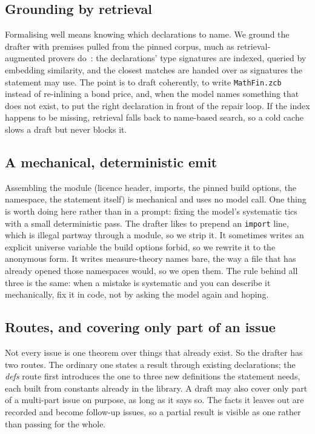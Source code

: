 \documentclass[11pt]{article}
\newcommand{\lean}[1]{\texttt{\def\_{\textunderscore\allowbreak}#1}}
\begin{document}
\subsection{Grounding by retrieval}
Formalising well means knowing which declarations to name. We ground the drafter with
premises pulled from the pinned corpus, much as retrieval-augmented provers
do~\cite{yang2023leandojo}: the declarations' type signatures are indexed, queried by
embedding similarity, and the closest matches are handed over as signatures the statement
may use. The point is to draft coherently, to write \lean{MathFin.zcb} instead
of re-inlining a bond price, and, when the model names something that does not exist, to
put the right declaration in front of the repair loop. If the index happens to be
missing, retrieval falls back to name-based search, so a cold cache slows a draft but
never blocks it.

\subsection{A mechanical, deterministic emit}
Assembling the module (licence header, imports, the pinned build options, the namespace,
the statement itself) is mechanical and uses no model call. One thing is worth doing here
rather than in a prompt: fixing the model's systematic tics with a small deterministic
pass. The drafter likes to prepend an \lean{import} line, which is illegal partway
through a module, so we strip it. It sometimes writes an explicit universe variable the
build options forbid, so we rewrite it to the anonymous form. It writes measure-theory
names bare, the way a file that has already opened those namespaces would, so we open
them. The rule behind all three is the same: when a mistake is systematic and you can
describe it mechanically, fix it in code, not by asking the model again and hoping.

\subsection{Routes, and covering only part of an issue}
Not every issue is one theorem over things that already exist. So the drafter has two
routes. The ordinary one states a result through existing declarations; the \emph{defs}
route first introduces the one to three new definitions the statement needs, each built
from constants already in the library. A draft may also cover only part of a multi-part
issue on purpose, as long as it says so. The facts it leaves out are recorded and become
follow-up issues, so a partial result is visible as one rather than passing for the whole.
\end{document}
